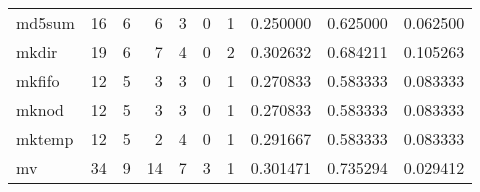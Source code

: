 \begin{longtable}{lrrrrrrrrr}
md5sum    &                                      16 &                                                  6 &                                                  6 &                                                  3 &                                                  0 &                                                  1 &                                           0.250000 &                               0.625000 &                             0.062500 \\
mkdir     &                                      19 &                                                  6 &                                                  7 &                                                  4 &                                                  0 &                                                  2 &                                           0.302632 &                               0.684211 &                             0.105263 \\
mkfifo    &                                      12 &                                                  5 &                                                  3 &                                                  3 &                                                  0 &                                                  1 &                                           0.270833 &                               0.583333 &                             0.083333 \\
mknod     &                                      12 &                                                  5 &                                                  3 &                                                  3 &                                                  0 &                                                  1 &                                           0.270833 &                               0.583333 &                             0.083333 \\
mktemp    &                                      12 &                                                  5 &                                                  2 &                                                  4 &                                                  0 &                                                  1 &                                           0.291667 &                               0.583333 &                             0.083333 \\
mv        &                                      34 &                                                  9 &                                                 14 &                                                  7 &                                                  3 &                                                  1 &                                           0.301471 &                               0.735294 &                             0.029412 \\

\end{longtable}
